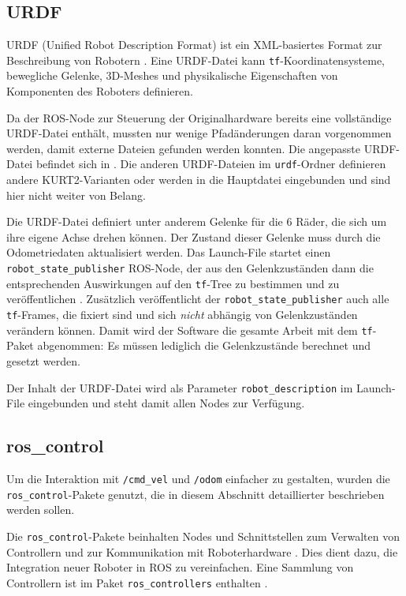 \documentclass[german]{thesis_KBS}
\newcommand{\code}[1]{\texttt{#1}}  %
\begin{document}
\subsection{URDF}

URDF (Unified Robot Description Format) ist ein XML-basiertes Format zur
Beschreibung von Robotern \cite{ros-urdf}. Eine URDF-Datei kann
\code{tf}-Koordinatensysteme, bewegliche Gelenke, 3D-Meshes und physikalische
Eigenschaften von Komponenten des Roboters definieren.

Da der ROS-Node zur Steuerung der Originalhardware bereits eine vollständige
URDF-Datei enthält, mussten nur wenige Pfadänderungen daran vorgenommen werden,
damit externe Dateien gefunden werden konnten. Die angepasste URDF-Datei
befindet sich in . Die anderen URDF-Dateien im
\code{urdf}-Ordner definieren andere KURT2-Varianten oder werden in die
Hauptdatei eingebunden und sind hier nicht weiter von Belang.

Die URDF-Datei definiert unter anderem Gelenke für die 6 Räder, die sich um ihre
eigene Achse drehen können. Der Zustand dieser Gelenke muss durch die
Odometriedaten aktualisiert werden. Das Launch-File 
startet einen \code{robot\_state\_publisher} ROS-Node, der aus den
Gelenkzuständen dann die entsprechenden Auswirkungen auf den \code{tf}-Tree zu
bestimmen und zu veröffentlichen \cite{ros-robot-state-publisher}. Zusätzlich
veröffentlicht der \code{robot\_state\_publisher} auch alle \code{tf}-Frames,
die fixiert sind und sich \emph{nicht} abhängig von Gelenkzuständen verändern
können. Damit wird der Software die gesamte Arbeit mit dem \code{tf}-Paket
abgenommen: Es müssen lediglich die Gelenkzustände berechnet und gesetzt werden.

Der Inhalt der URDF-Datei wird als Parameter \code{robot\_description} im
Launch-File  eingebunden und steht damit allen Nodes
zur Verfügung.


\subsection{ros\_control}

Um die Interaktion mit \code{/cmd\_vel} und \code{/odom} einfacher zu gestalten,
wurden die \code{ros\_control}-Pakete genutzt, die in diesem Abschnitt
detaillierter beschrieben werden sollen.

Die \code{ros\_control}-Pakete beinhalten Nodes und Schnittstellen zum Verwalten
von Controllern und zur Kommunikation mit Roboterhardware \cite{ros-control}.
Dies dient dazu, die Integration neuer Roboter in ROS zu vereinfachen. Eine
Sammlung von Controllern ist im Paket \code{ros\_controllers} enthalten
\cite{ros-controllers}.
\end{document}

